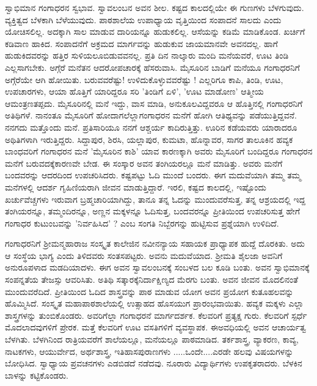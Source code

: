 {ಸ್ವಾಭಿಮಾನ ಗಂಗಾಧರನ ಸ್ವಭಾವ. ಸ್ವಾವಲಂಬನ ಅವನ ಶೀಲ. ಕಷ್ಟದ ಕಾಲ\-ದಲ್ಲಿಯೇ ಈ ಗುಣಗಳು ಬೆಳಗುವುದು. ವ್ಯಕ್ತಿತ್ವದ ಬೆಳಕಾಗಿ ಬೆಳೆಯುವುದು. ಪಾಠಶಾಲೆಯ    ಉಪಾಧ್ಯಾಯ ವೃತ್ತಿಯಿಂದ ಸಂಪಾದನೆ ಸಾಲದು ಎಂದು ಯೋಚಿಸಲಿಲ್ಲ. ಅದಕ್ಕಾಗಿ ಸಾಲ ಮಾಡುವ ದಾರಿಯನ್ನೂ ಹುಡುಕಲಿಲ್ಲ. ಆಸೆಯನ್ನು ಕಡಿಮೆ ಮಾಡಿಕೊಂಡ. ಖರ್ಚಿಗೆ ಕಡಿವಾಣ ಹಾಕಿದ. ಸಂಪಾದನೆಗೆ ಅಕ್ರಮದ ಮಾರ್ಗವನ್ನು ಹುಡುಕುವ ಜಾಯಮಾನವೇ ಅವನದಲ್ಲ. ಹಾಗೆ ಹುಡುಕಿದವರನ್ನು ಹತ್ತಿರ ಸುಳಿಯಲೂ\break ಬಿಡುವವನಲ್ಲ. ಪ್ರತಿ ದಿನ ನಾಲ್ಕಾರು ಮಂದಿ ಮನೆಯವರೆ, ಊಟ ತಿಂಡಿ ಎಲ್ಲ\break ಸಾಗಬೇಕು. ಅಗ್ಗೆರೆ ಮನೆತನ ಆದರೋಪಚಾರಕ್ಕೆ ಹೆಸರುವಾಸಿ. ಮೈಸೂರಿನ ಬಾಡಿಗೆ ಮನೆಯೂ ಗಂಗಾಧರನಿಗೆ ಅಗ್ಗೆರೆಯೇ ಆಗಿ ಹೋಯಿತು. ಬರುವವರೆಷ್ಟು! ಉಳಿದುಕೊಳ್ಳುವವರೆಷ್ಟು ! ಎಲ್ಲರಿಗೂ ಕಾಪಿ, ತಿಂಡಿ, ಊಟ, ಉಪಚಾರಗಳು, ಆಯಾ ಹೊತ್ತಿಗೆ ಯಾರಿದ್ದರೂ ಸರಿ 'ತಿಂಡಿಗೆ ಏಳಿ', 'ಊಟ ಮಾಡೋಣ' ಆತ್ಮೀಯ ಆಮಂತ್ರಣ\break ತಪ್ಪದು.  ಮೈಸೂರಿನಲ್ಲಿ ಮನೆ ಇದ್ದು, ವಾಸ ಮಾಡಿ, ಅನುಕೂಲವಿದ್ದವರೂ ಆ ಹೊತ್ತಿ\-ನಲ್ಲಿ ಗಂಗಾಧರನಿಗೆ ಅತಿಥಿಗಳೆ. ನಾನಂತೂ ಮೈಸೂರಿಗೆ ಹೋದಾಗಲೆಲ್ಲಾ\break ಗಂಗಾಧರನ ಮನೆಗೆ ಹೋಗಿ ಆತಿಥ್ಯವನ್ನು ಪಡೆಯುತ್ತಿದ್ದವನೆ. ನನಗದು ಮತ್ತೊಂದು ಮನೆ. ಪ್ರತಿಸಾರಿಯೂ ನನಗೆ ಆಶ್ಚರ್ಯ ಕಾದಿರುತ್ತಿತ್ತು. ಊರಿನ ಕಡೆಯವರು ಯಾರಾದರೂ ಅಥಿತಿಗಳಾಗಿ ಇರುತ್ತಿದ್ದರು. ಸಿದ್ದಾಪುರ, ಶಿರಸಿ, ಯಲ್ಲಾಪುರ, ಕುಮಟಾ, ಹೊನ್ನಾವರ, ಸಾಗರ ತಾಲೂಕಿನ ಹವ್ಯಕ ಬಾಂಧವರಿಗೆ ಗಂಗಾಧರನ ಮನೆ 'ಮೈಸೂರಿನ ಕಾಶಿ' ಯಾವ ಕಾರಣಕ್ಕಾಗಿ  ಅವರು ಮೈಸೂರಿಗೆ ಬಂದಿದ್ದರೂ ಗಂಗಾಧರನ ಮನೆಗೆ ಬರುವದಕ್ಕೆ\break ಕಾರಣವೇ ಬೇಡ. ಈ ಸಂಸ್ಕಾರ ಅವನ ತಂಗಿಯರಲ್ಲೂ  ಮನೆ ಮಾಡಿತ್ತು. ಅವರು ಮನೆಗೆ ಬಂದವರನ್ನು ಆದರದಿಂದ ಉಪಚರಿಸಿದರು. ಕಷ್ಟಪಟ್ಟು ಓದಿ ಮುಂದೆ ಬಂದರು. ಈಗ ಮದುವೆಯಾಗಿ ತಮ್ಮ ತಮ್ಮ ಮನೆಗಳಲ್ಲಿ ಆದರ್ಶ ಗೃಹಿಣಿಯರಾಗಿ ಜೀವನ ಮಾಡುತ್ತಿದ್ದಾರೆ. ಇರಲಿ, ಕಷ್ಟದ ಕಾಲದಲ್ಲಿ, ಇಷ್ಟೊಂದು ಖರ್ಚುವೆಚ್ಚಗಳು ಇರುವಾಗ ಬ್ರಹ್ಮಚಾರಿಯಾಗಿದ್ದು, ತಾನೂ ತನ್ನ ಓದನ್ನು ಮುಂದುವರೆಸುತ್ತ,  ತನ್ನ ಆಶ್ರಯದಲ್ಲಿ  ಇದ್ದ ತಂಗಿಯರನ್ನೂ, ತಮ್ಮಂದಿರನ್ನೂ, ಅಣ್ಣನ ಮಕ್ಕಳನ್ನೂ ಓದಿಸುತ್ತ, ಬಂದವರನ್ನೂ ಪ್ರೀತಿಯಿಂದ ಉಪಚರಿಸುತ್ತ  ಹೇಗೆ ಗಂಗಾಧರ ಕುಟುಂಬವನ್ನು 'ನಿರ್ವಹಿಸಿದ' ? ಎಂಬ ಸಂಗತಿ ನಿಬ್ಬೆರ\-ಗನ್ನು ಹುಟ್ಟಿಸುವ ಪ್ರಶ್ನೆಯಾಗಿ ಉಳಿದಿದೆ. 

ಗಂಗಾಧರನಿಗೆ ಶ್ರೀಮನ್ಮಹಾರಾಜ ಸಂಸ್ಕೃತ  ಕಾಲೇಜಿನ ನವೀನನ್ಯಾಯ  ಸಹಾಯಕ ಪ್ರಾಧ್ಯಾಪಕ ಹುದ್ದೆ ದೊರಕಿತು. ಅದು ಆ ಸಂಸ್ಥೆಯ ಭಾಗ್ಯ ಎಂದು ತಿಳಿದ\-ವರು ಸಂತಸಪಟ್ಟರು. ಅವನು ಮದುವೆಯಾದ. ಶ್ರೀಮತಿ ಶೈಲಜಾ ಅವನಿಗೆ ಅನುರೂಪಳಾದ ಮಡದಿಯಾದಳು. ಈಗ ಅವನ ಸ್ವಾವಲಂಬನಕ್ಕೆ ಸಂಬಳದ ಬಲ ಕೂಡಿ ಬಂತು. ಅವನ ಸ್ವಾಭಿಮಾನಕ್ಕೆ ಸಂಪನ್ನತೆಯ ತೇಜಸ್ಸು ಆವರಿಸಿತು. ಅತಿಥಿ ಸತ್ಕಾರಕ್ಕೆ\break ನಿರ್ದಾಕ್ಷಿಣ್ಯದ ಮೆರಗು ಬಂತು. ಅವನ ಜೀವನ ಮೊದಲಿನಂತೆ ಮುಂದುವರೆದಿದೆ. ಪ್ರೀತಿಯಿಂದ ಓದಿದ   ಶಾಸ್ತ್ರವನ್ನು ಪಾಠ ಮಾಡುವ ಯೋಗ ಅವನ ಪ್ರಯೋಗ ಕುತೂಹಲ\-ವನ್ನು ಹೊಮ್ಮಿಸಿದೆ. ಸಂಸ್ಕೃತ ಮಹಾಪಾಠಶಾಲೆಯಲ್ಲಿ  ಉತ್ಸಾಹದ ಹೊಸಯುಗ ಪ್ರಾರಂಭವಾಯಿತು. ಹವ್ಯಕ ಮಕ್ಕಳು ಎಲ್ಲಾ ಶಾಸ್ತ್ರಗಳನ್ನು ತುಂಬಿಕೊಂಡರು. ಅವರಿಗೆಲ್ಲಾ ಗಂಗಾಧರನೆ ಮಾರ್ಗದರ್ಶಕ. ಕೆಲವರಿಗೆ ಪ್ರತ್ಯಕ್ಷ ಗುರು. ಕೆಲವರಿಗೆ ಸ್ಪರ್ಧೆ ಮೊದಲಾದವುಗಳಿಗೆ ಪ್ರೇರಕ. ಮತ್ತೆ ಕೆಲವರಿಗೆ ಊಟ ವಸತಿಗಳಿಗೆ ವ್ಯವಸ್ಥಾಪಕ. ಈ\break ಅವಧಿಯಲ್ಲಿ ಅವನ ಆಚಾರ್ಯತ್ವ ಬೆಳಗಿತು.  ಬೆಳಗಿನಿಂದ ರಾತ್ರಿಯವರೆಗೆ ಶಾಲೆಯಲ್ಲೂ, ಮನೆಯಲ್ಲೂ ಪಾಠಮಾಡಿದ. ತರ್ಕಶಾಸ್ತ್ರ, ವ್ಯಾಕರಣ, ಕಾವ್ಯ, \hbox{ನಾಟಕಗಳು,} ಆಯುರ್ವೇದ, ಅರ್ಥಶಾಸ್ತ್ರ, ಇತಿಹಾಸಪುರಾಣಗಳು .....ಒಂದೇ....ಎರಡೇ ಹಲವು ವಿಷಯಗಳನ್ನು ಬೋಧಿಸಿದ. ಸ್ವಾಧ್ಯಾಯ ಪ್ರವಚನಗಳು ಎಡಬಿಡದೆ ನಡೆದವು. ನೂರಾರು ವಿದ್ಯಾರ್ಥಿಗಳು ಉಪಕೃತರಾದರು. ಬೆಳಕಿನ ಬಾಳನ್ನು ಕಟ್ಟಿಕೊಂಡರು. 

}
